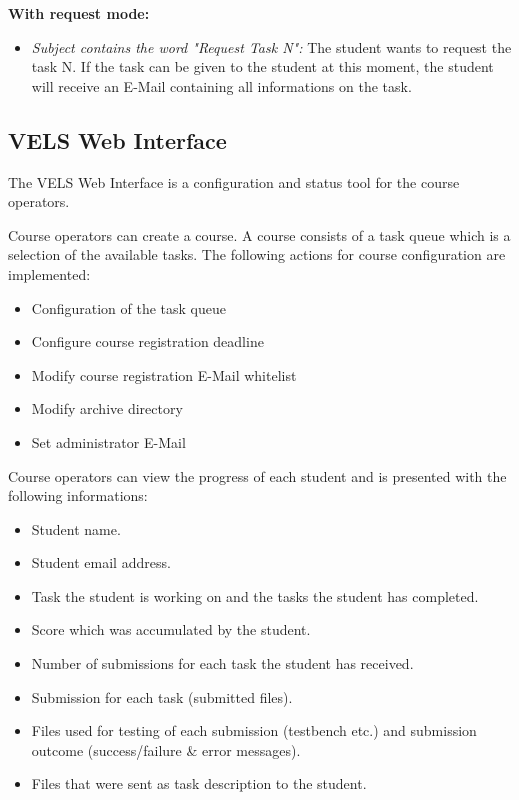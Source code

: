\textbf{With request mode:}
\begin{itemize}
\item \textit{Subject contains the word "Request Task N":} The student wants to request the task N. If the task can be
	given to the student at this moment, the student will receive an E-Mail containing all informations on the task.
\end{itemize}

\subsection{VELS Web Interface}\label{webinterface}

The VELS Web Interface is a configuration and status tool for the course operators.

Course operators can create a course. A course consists of a task queue which is a selection of the available tasks.
The following actions for course configuration  are implemented:
\begin{itemize}
\item Configuration of the task queue
\item Configure course registration deadline
\item Modify course registration E-Mail whitelist
\item Modify archive directory
\item Set administrator E-Mail
\end{itemize}

Course operators can view the progress of each student and is presented with the following informations:
\begin{itemize}
\item Student name.
\item Student email address.
\item Task the student is working on and the tasks the student has completed.
\item Score which was accumulated by the student.
\item Number of submissions for each task the student has received.
\item Submission for each task (submitted files).
\item Files used for testing of each submission (testbench etc.) and submission
outcome (success/failure \& error messages).
\item Files that were sent as task description to the student.
\end{itemize}

